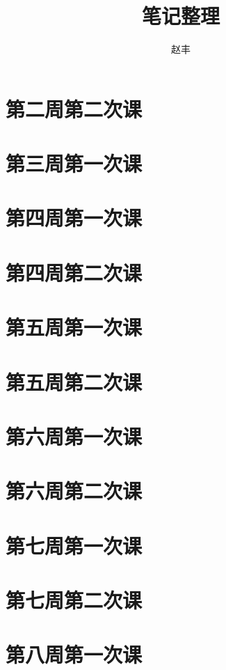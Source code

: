 \documentclass{article}
\numberwithin{equation}{section}
\begin{document}
\title{笔记整理}
\author{赵丰}
\maketitle
\tableofcontents
\section{第二周第二次课}

\section{第三周第一次课}

\section{第四周第一次课}

\section{第四周第二次课}

\section{第五周第一次课}

\section{第五周第二次课}

\section{第六周第一次课}

\section{第六周第二次课}\label{sec:62}

\section{第七周第一次课}

\section{第七周第二次课}

\section{第八周第一次课}\label{sec:81}

\end{document}
